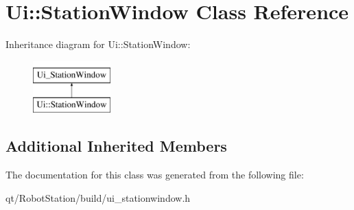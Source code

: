 \hypertarget{classUi_1_1StationWindow}{}\section{Ui\+:\+:Station\+Window Class Reference}
\label{classUi_1_1StationWindow}
Inheritance diagram for Ui\+:\+:Station\+Window\+:\begin{figure}[H]
\begin{center}
\leavevmode
\includegraphics[height=2.000000cm]{classUi_1_1StationWindow}
\end{center}
\end{figure}
\subsection*{Additional Inherited Members}


The documentation for this class was generated from the following file\+:\begin{DoxyCompactItemize}
\item 
qt/\+Robot\+Station/build/ui\+\_\+stationwindow.\+h\end{DoxyCompactItemize}
